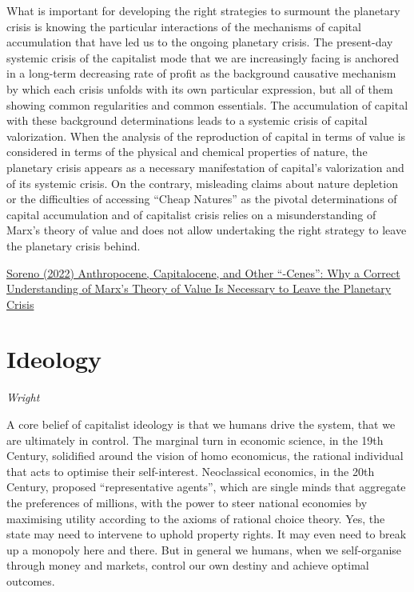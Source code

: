 \documentclass[
]{book}
\begin{document}
What is important for developing the right strategies to surmount the planetary crisis is knowing the particular interactions of the mechanisms of capital accumulation that have led us to the ongoing planetary crisis. The present-day systemic crisis of the capitalist mode that we are increasingly facing is anchored in a long-term decreasing rate of profit as the background causative mechanism by which each crisis unfolds with its own particular expression, but all of them showing common regularities and common essentials. The accumulation of capital with these background determinations leads to a systemic crisis of capital valorization. When the analysis of the reproduction of capital in terms of value is considered in terms of the physical and chemical properties of nature, the planetary crisis appears as a necessary manifestation of capital's valorization and of its systemic crisis. On the contrary, misleading claims about nature depletion or the difficulties of accessing ``Cheap Natures'' as the pivotal determinations of capital accumulation and of capitalist crisis relies on a misunderstanding of Marx's theory of value and does not allow undertaking the right strategy to leave the planetary crisis behind.

\href{https://monthlyreview.org/2022/11/01/anthropocene-capitalocene-and-other-cenes-why-a-correct-understanding-of-marxs-theory-of-value-is-necessary-to-leave-the-planetary-crisis/}{Soreno (2022) Anthropocene, Capitalocene, and Other ``-Cenes'': Why a Correct Understanding of Marx's Theory of Value Is Necessary to Leave the Planetary Crisis}

\hypertarget{ideology}{%
\chapter{Ideology}\label{ideology}}

\emph{Wright}

A core belief of capitalist ideology is that we humans drive the system, that we are ultimately in control. The marginal turn in economic science, in the 19th Century, solidified around the vision of homo economicus, the rational individual that acts to optimise their self-interest. Neoclassical economics, in the 20th Century, proposed ``representative agents'', which are single minds that aggregate the preferences of millions, with the power to steer national economies by maximising utility according to the axioms of rational choice theory. Yes, the state may need to intervene to uphold property rights. It may even need to break up a monopoly here and there. But in general we humans, when we self-organise through money and markets, control our own destiny and achieve optimal outcomes.
\end{document}
